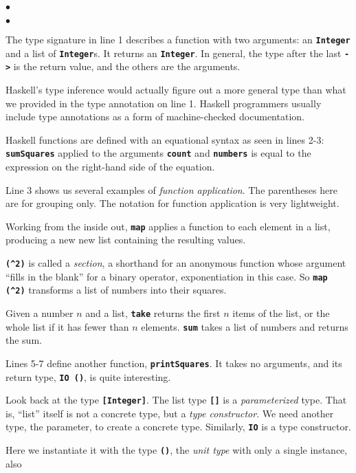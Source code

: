 \documentclass[12pt]{article}
\newcommand\codebold[1]{\texttt{\textbf{#1}}}
\newenvironment{notelist}{\begin{list}
   {$\bullet$}
   {\setlength{\itemsep}{0in}}}
   {\end{list}}
\begin{document}
\begin{notelist}
\begin{notelist}
    \item The type signature in line 1 describes a function with two arguments: an \codebold{Integer} and a list
          of \codebold{Integer}s. It returns an \codebold{Integer}. In general, the type after the last \codebold{->}
          is the return value, and the others are the arguments.
    \item Haskell's type inference would actually figure out a more general type than what we provided in the type
          annotation on line 1. Haskell programmers usually include type annotations as a form of machine-checked
          documentation.
    \item Haskell functions are defined with an equational syntax as seen in lines 2-3: \codebold{sumSquares}
          applied to the arguments \codebold{count} and \codebold{numbers} is equal to the expression on the
          right-hand side of the equation.
    \item Line 3 shows us several examples of \textit{function application}. The parentheses here are for grouping
          only. The notation for function application is very lightweight.
    \item Working from the inside out, \codebold{map} applies a function to each element in a list, producing a new 
          new list containing the resulting values.
    \item \codebold{(\string^2)} is called a \textit{section}, a shorthand for an anonymous function whose argument
          ``fills in the blank'' for a binary operator, exponentiation in this case. So \codebold{map (\string^2)}
          transforms a list of numbers into their squares.
    \item Given a number $n$ and a list, \codebold{take} returns the first $n$ items of the list, or the whole list
          if it has fewer than $n$ elements. \codebold{sum} takes a list of numbers and returns the sum.
    \item Lines 5-7 define another function, \codebold{printSquares}. It takes no arguments, and its return type, \codebold{IO ()},
          is quite interesting.
    \item Look back at the type \codebold{[Integer]}. The list type \codebold{[]} is a
          \textit{parameterized} type. That is, ``list'' itself is not a concrete type, but a \textit{type constructor}.
          We need another type, the parameter, to create a concrete type. Similarly, \codebold{IO} is a type constructor.
    \item Here we instantiate it with the type \codebold{()}, the \textit{unit type} with only a single instance, also

\end{notelist}
\end{notelist}
\end{document}
